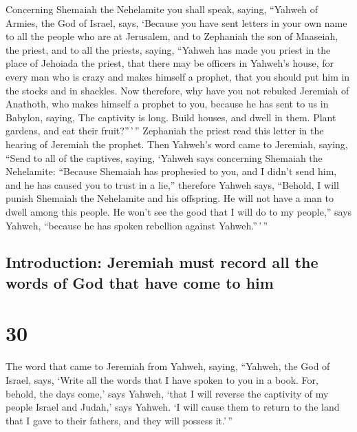  Concerning Shemaiah the Nehelamite you shall speak,
saying,  ``Yahweh of Armies, the God of Israel, says,
`Because you have sent letters in your own name to all the people who
are at Jerusalem, and to Zephaniah the son of Maaseiah, the priest, and
to all the priests, saying,  ``Yahweh has made you priest
in the place of Jehoiada the priest, that there may be officers in
Yahweh's house, for every man who is crazy and makes himself a prophet,
that you should put him in the stocks and in shackles. 
Now therefore, why have you not rebuked Jeremiah of Anathoth, who makes
himself a prophet to you,  because he has sent to us in
Babylon, saying, The captivity is long. Build houses, and dwell in them.
Plant gardens, and eat their fruit?''\,'\,''  Zephaniah
the priest read this letter in the hearing of Jeremiah the prophet.
 Then Yahweh's word came to Jeremiah, saying,
 ``Send to all of the captives, saying, `Yahweh says
concerning Shemaiah the Nehelamite: ``Because Shemaiah has prophesied to
you, and I didn't send him, and he has caused you to trust in a lie,''
 therefore Yahweh says, ``Behold, I will punish Shemaiah
the Nehelamite and his offspring. He will not have a man to dwell among
this people. He won't see the good that I will do to my people,'' says
Yahweh, ``because he has spoken rebellion against Yahweh.''\,'\,''

\hypertarget{introduction-jeremiah-must-record-all-the-words-of-god-that-have-come-to-him}{%
\subsection{Introduction: Jeremiah must record all the words of God that
have come to
him}\label{introduction-jeremiah-must-record-all-the-words-of-god-that-have-come-to-him}}

\hypertarget{section-29}{%
\section{30}\label{section-29}}

 The word that came to Jeremiah from Yahweh, saying,
 ``Yahweh, the God of Israel, says, `Write all the words
that I have spoken to you in a book.  For, behold, the
days come,' says Yahweh, `that I will reverse the captivity of my people
Israel and Judah,' says Yahweh. `I will cause them to return to the land
that I gave to their fathers, and they will possess it.'\,''

